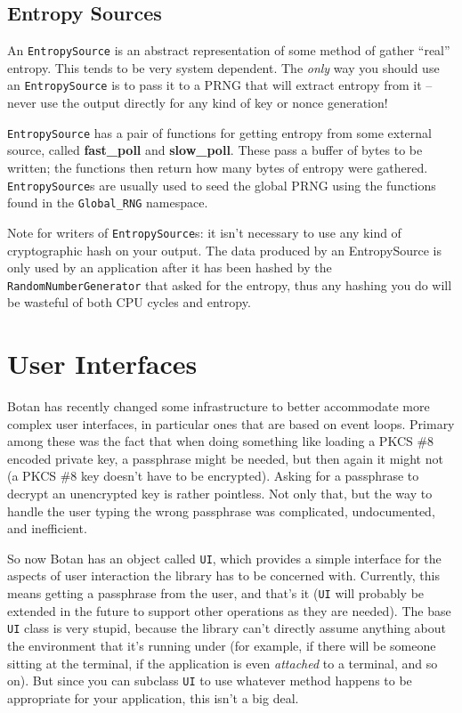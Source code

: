\documentclass{article}
\newcommand{\function}[1]{\textbf{#1}}
\newcommand{\type}[1]{\texttt{#1}}
\newcommand{\namespace}[1]{\texttt{#1}}
\begin{document}
\subsection{Entropy Sources}

An \type{EntropySource} is an abstract representation of some method of gather
``real'' entropy. This tends to be very system dependent. The \emph{only} way
you should use an \type{EntropySource} is to pass it to a PRNG that will
extract entropy from it -- never use the output directly for any kind of key or
nonce generation!

\type{EntropySource} has a pair of functions for getting entropy from
some external source, called \function{fast\_poll} and
\function{slow\_poll}. These pass a buffer of bytes to be written; the
functions then return how many bytes of entropy were
gathered. \type{EntropySource}s are usually used to seed the global
PRNG using the functions found in the \namespace{Global\_RNG}
namespace.

Note for writers of \type{EntropySource}s: it isn't necessary to use any kind
of cryptographic hash on your output. The data produced by an EntropySource is
only used by an application after it has been hashed by the
\type{RandomNumberGenerator} that asked for the entropy, thus any hashing
you do will be wasteful of both CPU cycles and entropy.

\section{User Interfaces}

Botan has recently changed some infrastructure to better accommodate
more complex user interfaces, in particular ones that are based on
event loops. Primary among these was the fact that when doing
something like loading a PKCS \#8 encoded private key, a passphrase
might be needed, but then again it might not (a PKCS \#8 key doesn't
have to be encrypted). Asking for a passphrase to decrypt an
unencrypted key is rather pointless. Not only that, but the way to
handle the user typing the wrong passphrase was complicated,
undocumented, and inefficient.

So now Botan has an object called \type{UI}, which provides a simple
interface for the aspects of user interaction the library has to be
concerned with. Currently, this means getting a passphrase from the
user, and that's it (\type{UI} will probably be extended in the future
to support other operations as they are needed). The base \type{UI}
class is very stupid, because the library can't directly assume
anything about the environment that it's running under (for example,
if there will be someone sitting at the terminal, if the application
is even \emph{attached} to a terminal, and so on). But since you can
subclass \type{UI} to use whatever method happens to be appropriate
for your application, this isn't a big deal.
\end{document}
